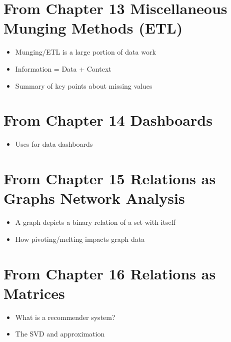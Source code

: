 \documentclass[letterpaper,10pt,english]{jupyterBook}
\begin{document}
\section{From Chapter 13 \sphinxhyphen{} Miscellaneous Munging Methods (ETL)}
\label{\detokenize{bigpic-list:from-chapter-13-miscellaneous-munging-methods-etl}}\begin{itemize}
\item {} 
\sphinxAtStartPar
Munging/ETL is a large portion of data work

\item {} 
\sphinxAtStartPar
Information = Data + Context

\item {} 
\sphinxAtStartPar
Summary of key points about missing values

\end{itemize}


\section{From Chapter 14 \sphinxhyphen{} Dashboards}
\label{\detokenize{bigpic-list:from-chapter-14-dashboards}}\begin{itemize}
\item {} 
\sphinxAtStartPar
Uses for data dashboards

\end{itemize}


\section{From Chapter 15 \sphinxhyphen{} Relations as Graphs \sphinxhyphen{} Network Analysis}
\label{\detokenize{bigpic-list:from-chapter-15-relations-as-graphs-network-analysis}}\begin{itemize}
\item {} 
\sphinxAtStartPar
A graph depicts a binary relation of a set with itself

\item {} 
\sphinxAtStartPar
How pivoting/melting impacts graph data

\end{itemize}


\section{From Chapter 16 \sphinxhyphen{} Relations as Matrices}
\label{\detokenize{bigpic-list:from-chapter-16-relations-as-matrices}}\begin{itemize}
\item {} 
\sphinxAtStartPar
What is a recommender system?

\item {} 
\sphinxAtStartPar
The SVD and approximation

\end{itemize}
\end{document}
